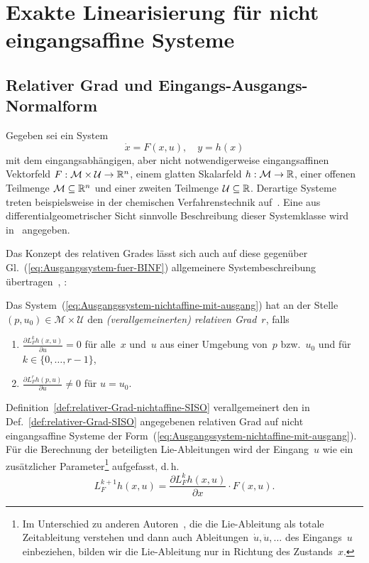 \section{Exakte Linearisierung für nicht eingangsaffine Systeme\label{sec:Nicht-eingangsaffine-Systeme}}

\subsection{Relativer Grad und Eingangs-Ausgangs-Normalform\label{subsec:Relativer-Grad-nichtaffine}}

Gegeben sei ein System 
\begin{equation}
\dot{x}=F(x,u),\quad y=h(x)\label{eq:Ausgangssystem-nichtaffine-mit-ausgang}
\end{equation}
mit dem eingangsabhängigen, aber nicht notwendigerweise eingangsaffinen
Vektorfeld $F:\mathcal{M}\times\mathcal{U}\to{\mathbb{R}}^{n}$, einem glatten
Skalarfeld $h:\mathcal{M}\to{\mathbb{R}}$, einer offenen Teilmenge $\mathcal{M}\subseteq{\mathbb{R}}^{n}$
und einer zweiten Teilmenge $\mathcal{U}\subseteq{\mathbb{R}}$. Derartige Systeme
treten beispielsweise in der chemischen Verfahrenstechnik auf~\cite{henson1990}.
Eine aus differentialgeometrischer Sicht sinnvolle Beschreibung dieser
Systemklasse wird in~\cite{schaft1984} angegeben.

Das Konzept des relativen Grades lässt sich auch auf diese gegenüber
Gl.~(\ref{eq:Ausgangssystem-fuer-BINF}) allgemeinere Systembeschreibung
übertragen~\cite{tsinias1983,henson1990}, \cite[Kapitel~13]{nijmeijer90}:
\begin{definition}
\label{def:relativer-Grad-nichtaffine-SISO}Das System~(\ref{eq:Ausgangssystem-nichtaffine-mit-ausgang})
hat an der Stelle $(p,u_{0})\in\mathcal{M}\times\mathcal{U}$ den
\emph{(verallgemeinerten) relativen Grad}~$r$,
falls

\begin{enumerate}
\item $\frac{\partial L_{F}^{k}h(x,u)}{\partial u}=0$ für alle~$x$ und~$u$
aus einer Umgebung von~$p$ bzw.~$u_{0}$ und für $k\in\{0,\ldots,r-1\}$, 
\item $\frac{\partial L_{F}^{r}h(p,u)}{\partial u}\neq0$ für $u=u_{0}$.
\end{enumerate}
\end{definition}

Definition~\ref{def:relativer-Grad-nichtaffine-SISO} verallgemeinert
den in Def.~\ref{def:relativer-Grad-SISO} angegebenen relativen
Grad auf nicht eingangsaffine Systeme der Form~(\ref{eq:Ausgangssystem-nichtaffine-mit-ausgang}).
Für die Berechnung der beteiligten Lie-Ableitungen wird der Eingang~$u$
wie ein zusätzlicher Parameter\footnote{Im Unterschied zu anderen Autoren~\cite{bestle83}, die die Lie-Ableitung
als totale Zeitableitung verstehen und dann auch Ableitungen~$\dot{u},\ddot{u},\ldots$
des Eingangs~$u$ einbeziehen, bilden wir die Lie-Ableitung nur in
Richtung des Zustands~$x.$} aufgefasst, d.\,h. 
\[
L_{F}^{k+1}h(x,u)=\frac{\partial L_{F}^{k}h(x,u)}{\partial x}\cdot F(x,u).
\]

